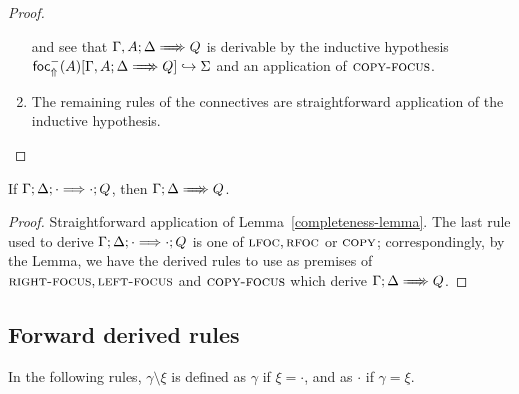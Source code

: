 \begin{proof}
\begin{enumerate}
    and see that $\bneuseq{\Gamma, A}{\Delta}{Q}$ is derivable by
    the inductive hypothesis
    $\relj{\blfrel{A}}{\bneuseq{\Gamma,A}{\Delta}{Q}}{\Sigma}$ and an application
    of $\textsc{copy-focus}$.
  \item The remaining rules of the connectives are straightforward application
    of the inductive hypothesis.
  \end{enumerate}
\end{proof}

\begin{theorem}[Completeness]
  If $\Gamma; \Delta; \cdot \Longrightarrow \cdot ; Q$, then
  $\bneuseq{\Gamma}{\Delta}{Q}$.
\end{theorem}
\begin{proof}
  Straightforward application of Lemma~\ref{completeness-lemma}. The last rule
  used to derive $\Gamma; \Delta; \cdot \Longrightarrow \cdot ; Q$ is one of
  $\textsc{lfoc}, \textsc{rfoc}$ or $\textsc{copy}$; correspondingly, by the Lemma, we have the
  derived rules to use as premises of $\textsc{right-focus}, \textsc{left-focus}$ and
  $\textsc{copy-focus}$ which derive $\bneuseq{\Gamma}{\Delta}{Q}$.
\end{proof}

\subsection{Forward derived rules}

In the following rules, $\gamma \setminus \xi$ is defined as $\gamma$ if $\xi = \cdot$,
and as $\cdot$ if $\gamma = \xi$.

